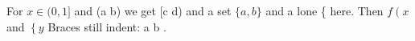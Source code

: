\documentclass{article}
\begin{document}
For $x \in (0,1]$ and (a
b) we get [c
d) and a set $\{a,
b\}$ and a lone \{ here.
Then $f\left( x \right.$ and $\left\{ y \right.$
Braces still indent: {a
b
}.
\end{document}
